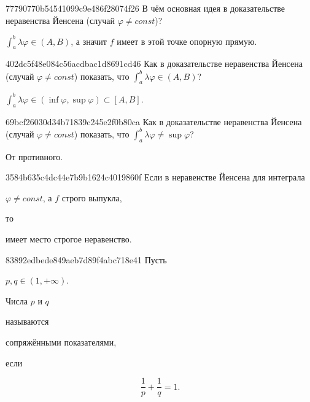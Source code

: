 \begin{note}{77790770b54541099c9e486f28074f26}
    В чём основная идея в доказательстве неравенства Йенсена (случай \({ \varphi \neq const }\))?

    \begin{cloze}{1}
        \({ \int_{a}^{b} \lambda\varphi \in (A, B) }\), а значит \({ f }\) имеет в этой точке опорную прямую.
    \end{cloze}
\end{note}

\begin{note}{402dc5f48e084c56acdbac1d8691cd46}
    Как в доказательстве неравенства Йенсена (случай \({ \varphi \neq const }\)) показать, что \({ \int_{a}^{b} \lambda \varphi \in (A, B) }\)?

    \begin{cloze}{1}
        \begin{center}
            \({ \int_{a}^{b} \lambda \varphi \in (\inf \varphi, \sup \varphi) \subset [A, B] }\).
        \end{center}
    \end{cloze}
\end{note}

\begin{note}{69bcf26030d34b71839c245e2f0b80ca}
    Как в доказательстве неравенства Йенсена (случай \({ \varphi \neq const }\)) показать, что \({ \int_{a}^{b} \lambda \varphi \neq \sup \varphi }\)?

    \begin{cloze}{1}
        От противного.
    \end{cloze}
\end{note}

\begin{note}{3584b635c4dc44e7b9b1624c4019860f}
    Если в неравенстве Йенсена для интеграла \begin{icloze}{2}\({ \varphi \neq const }\), а \({ f }\) строго выпукла,\end{icloze} то \begin{icloze}{1}имеет место строгое неравенство.\end{icloze}
\end{note}

\begin{note}{83892edbede849aeb7d89f4abc718e41}
    Пусть \begin{icloze}{3}\({ p, q \in (1, +\infty) }\).\end{icloze}
    \begin{icloze}{1}Числа \({ p }\) и \({ q }\)\end{icloze} называются \begin{icloze}{2}сопряжёнными показателями,\end{icloze} если
    \begin{icloze}{1}
        \[
            \frac{1}{p} + \frac{1}{q} = 1.
        \]
    \end{icloze}
\end{note}

